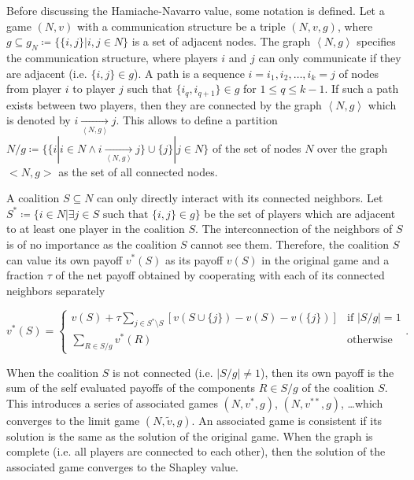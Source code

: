 Before discussing the Hamiache-Navarro value, some notation is defined. Let a game $(N, v)$ with a
communication structure be a triple $(N, v, g)$, where $g \subseteq g_N \coloneqq \{ \{i, j \} | i, j \in N \}$
is a set of adjacent nodes. The graph $\left< N, g \right>$ specifies the
communication structure, where players $i$ and $j$ can only communicate if they are adjacent
(i.e. $\{i, j \} \in g$). A path is a sequence $i = i_1, i_2, \dots , i_k = j$ of nodes from player
$i$ to player $j$ such that $\{i_q, i_{q+1} \} \in g$ for $1 \le q \le k - 1$. If such a path exists
between two players, then they are connected by the graph $\left<N, g\right>$ which is denoted by
$i \underset{\left< N, g \right>}{\rightarrow} j$. This allows to define a partition
$N/g \coloneqq \{\{ i | i \in N \land i \underset{\left<N, g \right>}{\rightarrow} j\} \cup \{j\} | j \in N \}$
of the set of nodes $N$ over the graph $<N, g>$ as the set of all connected nodes.\cite{hamiache_value_1999}

A coalition $S \subseteq N$ can only directly interact with its connected neighbors. Let
$S^* \coloneqq \{ i \in N | \exists j \in S \text{ such that } \{i, j\} \in g \}$ be the set of players
which are adjacent to at least one player in the coalition $S$. The interconnection of the neighbors of
$S$ is of no importance as the coalition $S$ cannot see them. Therefore, the coalition $S$ can value its
own payoff $v^*(S)$ as its payoff $v(S)$ in the original game and a fraction $\tau$ of the net payoff obtained
by cooperating with each of its connected neighbors separately\cite{hamiache2001associated}


\begin{equation}
	\label{eq:associated_game}
	v^*(S) =
	\begin{cases}
		\displaystyle
		v(S) + \tau \sum_{j \in S^* \setminus S} \left[ v(S \cup \{j\}) - v(S) - v(\{j\}) \right] & \text{if } |S/g| = 1 \\
		\displaystyle
		\sum_{R \in S/g} v^*(R)                                                                   & \text{otherwise}
	\end{cases}
	.
\end{equation}

When the coalition $S$ is not connected (i.e. $|S/g| \ne 1$), then its own payoff is the sum of the self
evaluated payoffs of the components $R \in S/g$ of the coalition $S$.
This introduces a series of associated games $(N, v^*, g)$, $(N, v^{**}, g)$, \dots which converges
to the limit game $(N, \tilde{v}, g)$. An associated game is consistent if its solution is the same
as the solution of the original game. When the graph is complete (i.e. all players are connected to
each other), then the solution of the associated game converges to the Shapley value.\cite{hamiache2001associated}


